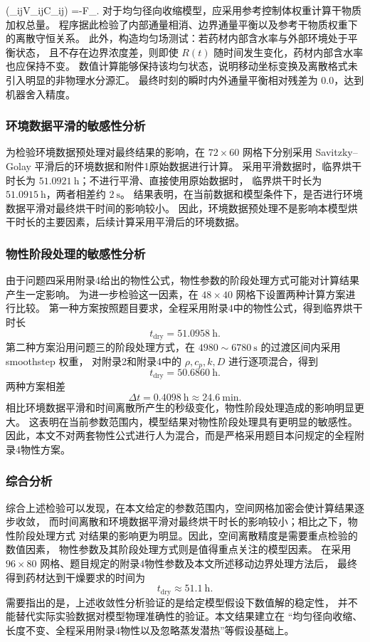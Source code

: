 \documentclass[12pt,a4paper]{ctexart}
\begin{document}
\left(\sum_{ij}V_{ij}C_{ij}\right) =-F_{}. \] 对于均匀径向收缩模型，应采用参考控制体权重计算干物质加权总量。 程序据此检验了内部通量相消、边界通量平衡以及参考干物质权重下的离散守恒关系。 此外，构造均匀场测试：若药材内部含水率与外部环境处于平衡状态， 且不存在边界浓度差，则即使 $R(t)$ 随时间发生变化，药材内部含水率也应保持不变。 数值计算能够保持该均匀状态，说明移动坐标变换及离散格式未引入明显的非物理水分源汇。 最终时刻的瞬时内外通量平衡相对残差为 $0.0$，达到机器舍入精度。 \subsubsection{环境数据平滑的敏感性分析} 为检验环境数据预处理对最终结果的影响，在 $72\times60$ 网格下分别采用 Savitzky--Golay 平滑后的环境数据和附件1原始数据进行计算。 采用平滑数据时，临界烘干时长为 $51.0921\ \mathrm{h}$；不进行平滑、直接使用原始数据时， 临界烘干时长为 $51.0915\ \mathrm{h}$，两者相差约 $2\ \mathrm{s}$。 结果表明，在当前数据和模型条件下，是否进行环境数据平滑对最终烘干时间的影响较小。 因此，环境数据预处理不是影响本模型烘干时长的主要因素，后续计算采用平滑后的环境数据。 \subsubsection{物性阶段处理的敏感性分析} 由于问题四采用附录4给出的物性公式，物性参数的阶段处理方式可能对计算结果产生一定影响。 为进一步检验这一因素，在 $48\times40$ 网格下设置两种计算方案进行比较。 第一种方案按照题目要求，全程采用附录4中的物性公式，得到临界烘干时长 \[ t_{\mathrm{dry}}=51.0958\ \mathrm{h}. \] 第二种方案沿用问题三的阶段处理方式，在 $4980\sim6780\ \mathrm{s}$ 的过渡区间内采用 smoothstep 权重， 对附录2和附录4中的 $\rho,c_p,k,D$ 进行逐项混合，得到 \[ t_{\mathrm{dry}}=50.6860\ \mathrm{h}. \] 两种方案相差 \[ \Delta t=0.4098\ \mathrm{h}\approx24.6\ \mathrm{min}. \] 相比环境数据平滑和时间离散所产生的秒级变化，物性阶段处理造成的影响明显更大。 这表明在当前参数范围内，模型结果对物性阶段处理具有更明显的敏感性。 因此，本文不对两套物性公式进行人为混合，而是严格采用题目本问规定的全程附录4物性方案。 \subsubsection{综合分析} 综合上述检验可以发现，在本文给定的参数范围内，空间网格加密会使计算结果逐步收敛， 而时间离散和环境数据平滑对最终烘干时长的影响较小；相比之下，物性阶段处理方式 对结果的影响更为明显。因此，空间离散精度是需要重点检验的数值因素， 物性参数及其阶段处理方式则是值得重点关注的模型因素。 在采用 $96\times80$ 网格、题目规定的附录4物性参数及本文所述移动边界处理方法后， 最终得到药材达到干燥要求的时间为 \[ \boxed{t_{\mathrm{dry}}\approx51.1\ \mathrm{h}}. \] 需要指出的是，上述收敛性分析验证的是给定模型假设下数值解的稳定性， 并不能替代实际实验数据对模型物理准确性的验证。本文结果建立在 “均匀径向收缩、长度不变、全程采用附录4物性以及忽略蒸发潜热”等假设基础上。
\end{document}
